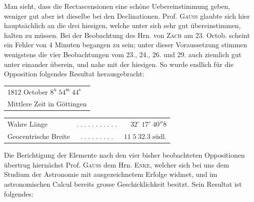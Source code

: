 \par\indent Man sieht, dass die Rectascensionen eine schöne Uebereinstimmung geben, weniger gut aber ist dieselbe
bei den Declinationen. Prof. \textsc{Gauss} glaubte sich hier hauptsächlich an die drei hiesigen, welche unter
sich sehr gut übereinstimmen, halten zu müssen. Bei der Beobachtung des Hrn. von \textsc{Zach} am 23. Octob.
scheint ein Fehler von 4 Minuten begangen zu sein; unter dieser Voraussetzung stimmen wenigstens die
vier Beobachtungen vom 23., 24., 26. und 29. auch ziemlich gut unter einander überein, und nahe mit
der hiesigen. So wurde endlich für die Opposition folgendes Resultat herausgebracht:

\medskip
\begin{center}\fontsize{10}{12}\selectfont\setlength{\tabcolsep}{2pt}\renewcommand{\arraystretch}{1.15}\begin{tabular}{l}
1812 October $8^{\mathrm u}\;54^{\mathrm m}\;44^{\mathrm s}$\\Mittlere Zeit in Göttingen
\end{tabular}\end{center}
\begin{center}\fontsize{10}{12}\selectfont\setlength{\tabcolsep}{2pt}\renewcommand{\arraystretch}{1.15}\begin{tabular}{lcr}
Wahre Länge & $.\;.\;.\;.\;.\;.\;.\;.\;.\;.\;.$ & $32^\circ\;17'\;40''8$\\
Geocentrische Breite & $.\;.\;.\;.\;.\;.\;.\;.\;.$ & $11\;5\;32.3\;\text{südl.}$\\
\end{tabular}\end{center}

\par\indent Die Berichtigung der Elemente nach den vier bisher beobachteten Oppositionen übertrug hiernächst
Prof. \textsc{Gauss} dem Hrn. \textsc{Enke}, welcher sich bei uns dem Studium der Astronomie mit ausgezeichnetem Erfolge
widmet, und im astronomischen Calcul bereits grosse Geschicklichkeit besitzt. Sein Resultat ist
folgendes:

